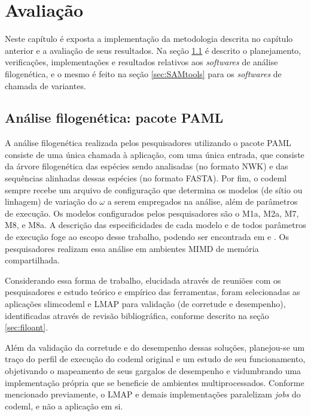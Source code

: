 \documentclass[cic,tc]{iiufrgs}
\begin{document}
%
%
%
%
\chapter{Avaliação}
\label{chap:imp}

Neste capítulo é exposta a implementação da metodologia descrita no capítulo
anterior e a avaliação de seus resultados. Na seção \ref{sec:filomp} é descrito o
planejamento, verificações, implementações e resultados relativos aos \textit{softwares}
de análise filogenética, e o mesmo é feito na seção \ref{sec:SAMtools} para os
\textit{softwares} de chamada de variantes.

\section{Análise filogenética: pacote PAML}
\label{sec:filomp}

A análise filogenética realizada pelos pesquisadores utilizando o pacote PAML
consiste de uma única chamada à aplicação, com uma única entrada, que consiste
da árvore filogenética das espécies sendo analisadas (no formato NWK) e das
sequências alinhadas dessas espécies (no formato FASTA). Por fim, o codeml
sempre recebe um arquivo de configuração que determina os modelos (de sítio ou
linhagem) de variação do $\omega$ a serem empregados na análise, além de
parâmetros de execução. Os modelos configurados pelos pesquisadores são o M1a,
M2a, M7, M8, e M8a. A descrição das especificidades de cada modelo e de todos
parâmetros de execução foge ao escopo desse trabalho, podendo ser encontrada em
\cite{yang2000codon} e \cite{zhang2005evaluation}. Os pesquisadores realizam
essa análise em ambientes MIMD de memória compartilhada.

Considerando essa forma de trabalho, elucidada através de reuniões com os
pesquisadores e estudo teórico e empírico das ferramentas, foram selecionadas
as aplicações slimcodeml e LMAP para validação (de corretude e desempenho),
identificadas através de revisão bibliográfica, conforme descrito na seção
\ref{sec:filoant}.

Além da validação da corretude e do desempenho dessas soluções, planejou-se
um traço do perfil de execução do codeml original e um estudo de seu
funcionamento, objetivando o mapeamento de seus gargalos de desempenho e
vislumbrando uma implementação própria que se beneficie de ambientes
multiprocessados. Conforme mencionado previamente, o LMAP e demais
implementações paralelizam \textit{jobs} do codeml, e não a aplicação em si. 
\end{document}
